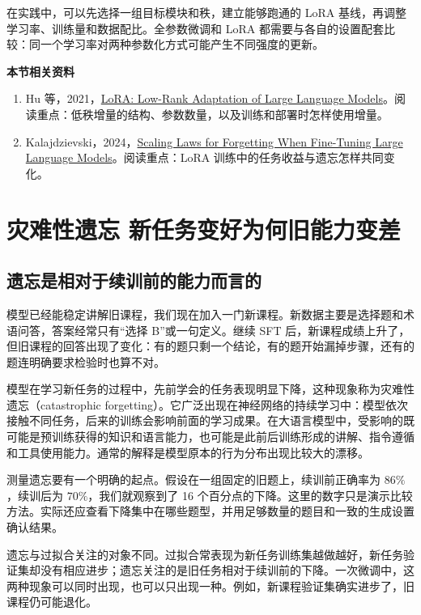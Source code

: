 在实践中，可以先选择一组目标模块和秩，建立能够跑通的 LoRA 基线，再调整学习率、训练量和数据配比。全参数微调和 LoRA 都需要与各自的设置配套比较：同一个学习率对两种参数化方式可能产生不同强度的更新。

\textbf{本节相关资料}
\begin{enumerate}
    \item Hu 等，2021，\href{https://arxiv.org/abs/2106.09685}{LoRA: Low-Rank Adaptation of Large Language Models}。阅读重点：低秩增量的结构、参数数量，以及训练和部署时怎样使用增量。
    \item Kalajdzievski，2024，\href{https://arxiv.org/abs/2401.05605}{Scaling Laws for Forgetting When Fine-Tuning Large Language Models}。阅读重点：LoRA 训练中的任务收益与遗忘怎样共同变化。
\end{enumerate}

\section{灾难性遗忘 新任务变好为何旧能力变差}\label{续训退化 新任务变好为何旧能力变差}

\subsection{遗忘是相对于续训前的能力而言的}

模型已经能稳定讲解旧课程，我们现在加入一门新课程。新数据主要是选择题和术语问答，答案经常只有“选择 B”或一句定义。继续 SFT 后，新课程成绩上升了，但旧课程的回答出现了变化：有的题只剩一个结论，有的题开始漏掉步骤，还有的题连明确要求检验时也算不对。

模型在学习新任务的过程中，先前学会的任务表现明显下降，这种现象称为灾难性遗忘（catastrophic forgetting）。它广泛出现在神经网络的持续学习中：模型依次接触不同任务，后来的训练会影响前面的学习成果。在大语言模型中，受影响的既可能是预训练获得的知识和语言能力，也可能是此前后训练形成的讲解、指令遵循和工具使用能力。通常的解释是模型原本的行为分布出现比较大的漂移。

测量遗忘要有一个明确的起点。假设在一组固定的旧题上，续训前正确率为 $86\%$，续训后为 $70\%$，我们就观察到了 16 个百分点的下降。这里的数字只是演示比较方法。实际还应查看下降集中在哪些题型，并用足够数量的题目和一致的生成设置确认结果。

遗忘与过拟合关注的对象不同。过拟合常表现为新任务训练集越做越好，新任务验证集却没有相应进步；遗忘关注的是旧任务相对于续训前的下降。一次微调中，这两种现象可以同时出现，也可以只出现一种。例如，新课程验证集确实进步了，旧课程仍可能退化。

